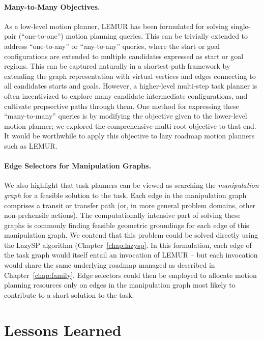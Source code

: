 \paragraph{Many-to-Many Objectives.}
As a low-level motion planner,
LEMUR has been formulated for solving single-pair
(``one-to-one'') motion planning queries.
This can be trivially extended to address ``one-to-any''
or ``any-to-any'' queries, where the start or goal configurations are
extended to multiple candidates expressed as start or goal regions.
This can be captured naturally in a shortest-path framework by extending
the graph representation with virtual vertices and edges connecting
to all candidates starts and goals.
However, a higher-level multi-step task planner is often incentivized
to explore many candidate intermediate configurations,
and cultivate propsective paths through them.
One method for expressing these ``many-to-many'' queries is by
modifying the objective given to the lower-level motion planner;
we explored the comprehensive multi-root objective
\citep{dellin2015cmr} to that end.
It would be worthwhile to apply this objective to lazy roadmap motion
planners such as LEMUR.

\paragraph{Edge Selectors for Manipulation Graphs.}
We also highlight that task planners can be viewed as searching
the \emph{manipulation graph} \citep{simeon2004manipulation}
for a feasible solution to the task.
Each edge in the manipulation graph comprises a transit or transfer
path
(or, in more general problem domains, other non-prehensile actions).
The computationally intensive part of solving these graphs is
commonly finding feasible geometric groundings for each edge of this
manipulation graph.
We contend that this problem could be solved directly using the LazySP
algorithm (Chapter~\ref{chap:lazysp}.
In this formulation,
each edge of the task graph would itself entail an invocation of LEMUR
-- but each invocation would share the same underlying roadmap
managed as described in Chapter~\ref{chap:family}.
Edge selectors could then be employed to allocate motion planning
resources only on edges in the manipulation graph
most likely to contribute to a short solution to the task.


\section{Lessons Learned}
\label{sec:conclusion:lessons-learned}

